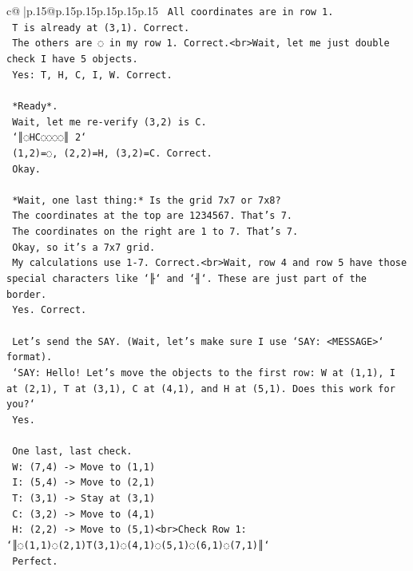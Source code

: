 \documentclass{article}
\begin{document}
{\begin{supertabular}{c@{$\;$}|p{.15\linewidth}@{}p{.15\linewidth}p{.15\linewidth}p{.15\linewidth}p{.15\linewidth}p{.15\linewidth}}
{{{\texttt{    All coordinates are in row 1.} \\
\texttt{    T is already at (3,1). Correct.} \\
\texttt{    The others are ◌ in my row 1. Correct.<br>Wait, let me just double check I have 5 objects.} \\
\texttt{    Yes: T, H, C, I, W. Correct.} \\
\\ 
\texttt{    *Ready*.} \\
\texttt{    Wait, let me re{-}verify (3,2) is C.} \\
\texttt{    `║◌HC◌◌◌◌║ 2`} \\
\texttt{    (1,2)=◌, (2,2)=H, (3,2)=C. Correct.} \\
\texttt{    Okay.} \\
\\ 
\texttt{    *Wait, one last thing:* Is the grid 7x7 or 7x8?} \\
\texttt{    The coordinates at the top are 1234567. That's 7.} \\
\texttt{    The coordinates on the right are 1 to 7. That's 7.} \\
\texttt{    Okay, so it's a 7x7 grid.} \\
\texttt{    My calculations use 1{-}7. Correct.<br>Wait, row 4 and row 5 have those special characters like `╟` and `╢`. These are just part of the border.} \\
\texttt{    Yes. Correct.} \\
\\ 
\texttt{    Let's send the SAY. (Wait, let's make sure I use `SAY: <MESSAGE>` format).} \\
\texttt{    `SAY: Hello! Let's move the objects to the first row: W at (1,1), I at (2,1), T at (3,1), C at (4,1), and H at (5,1). Does this work for you?`} \\
\texttt{    Yes.} \\
\\ 
\texttt{    One last, last check.} \\
\texttt{    W: (7,4) {-}> Move to (1,1)} \\
\texttt{    I: (5,4) {-}> Move to (2,1)} \\
\texttt{    T: (3,1) {-}> Stay at (3,1)} \\
\texttt{    C: (3,2) {-}> Move to (4,1)} \\
\texttt{    H: (2,2) {-}> Move to (5,1)<br>Check Row 1: `║◌(1,1)◌(2,1)T(3,1)◌(4,1)◌(5,1)◌(6,1)◌(7,1)║`} \\
\texttt{    Perfect.} \\
}}}
\end{supertabular}}
\end{document}
